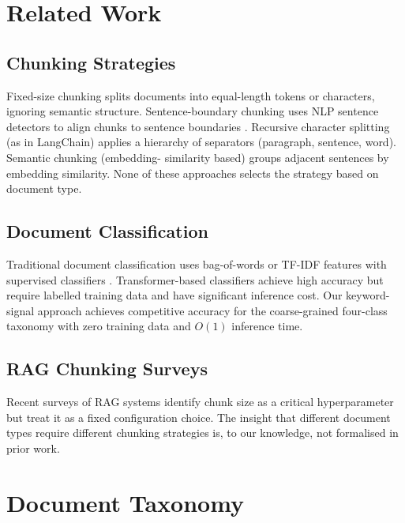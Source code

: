 \documentclass[conference]{IEEEtran}
\begin{document}
\section{Related Work}
\label{sec:related}

\subsection{Chunking Strategies}

Fixed-size chunking \cite{baeza1999modern} splits documents
into equal-length tokens or characters, ignoring semantic
structure. Sentence-boundary chunking uses NLP sentence
detectors to align chunks to sentence boundaries
\cite{chen2017reading}. Recursive character splitting
(as in LangChain) applies a hierarchy of separators
(paragraph, sentence, word). Semantic chunking (embedding-
similarity based) groups adjacent sentences by embedding
similarity. None of these approaches selects the strategy
based on document type.

\subsection{Document Classification}

Traditional document classification uses bag-of-words or
TF-IDF features with supervised classifiers
\cite{sparck1972statistical}. Transformer-based classifiers
achieve high accuracy but require labelled training data
and have significant inference cost. Our keyword-signal
approach achieves competitive accuracy for the
coarse-grained four-class taxonomy with zero training
data and $O(1)$ inference time.

\subsection{RAG Chunking Surveys}

Recent surveys of RAG systems \cite{lewis2020rag} identify
chunk size as a critical hyperparameter but treat it as a
fixed configuration choice. The insight that different
document types require different chunking strategies is,
to our knowledge, not formalised in prior work.

\section{Document Taxonomy}
\label{sec:taxonomy}
\end{document}
